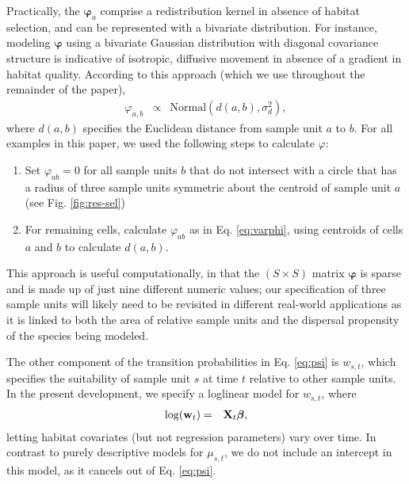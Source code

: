 \documentclass[12pt,english]{article}
\begin{document}
\begin{spacing}{1.9}
Practically, the $\boldsymbol{\varphi}_a$ comprise a redistribution kernel in absence of habitat selection, and can be represented with a bivariate distribution.  For instance, modeling $\boldsymbol{\varphi}$ using a bivariate Gaussian distribution with diagonal covariance structure is indicative of isotropic, diffusive movement in absence of a gradient in habitat quality.  According to this approach (which we use throughout the remainder of the paper),
\begin{eqnarray}
  \varphi_{a,b} & \propto & \text{Normal}(d(a,b),\sigma_d^2), \label{eq:varphi}
\end{eqnarray}
where $d(a,b)$ specifies the Euclidean distance from sample unit $a$ to $b$. For all examples in this paper, we used the following steps to calculate $\varphi$:
\begin{enumerate}
  \item Set $\varphi_{ab}=0$ for all sample units $b$ that do not intersect with a circle that has a radius of three sample units symmetric about the centroid of sample unit $a$ (see Fig. \ref{fig:res-sel})
  \item For remaining cells, calculate $\varphi_{ab}$ as in Eq. \ref{eq:varphi}, using centroids of cells $a$ and $b$ to calculate $d(a,b)$.
\end{enumerate}
This approach is useful computationally, in that the $(S \times S)$ matrix $\boldsymbol{\varphi}$ is sparse and is made up of just nine different numeric values; our specification of three sample units will likely need to be revisited in different real-world applications as it is linked to both the area of relative sample units and the dispersal propensity of the species being modeled.

The other component of the transition probabilities in Eq. \ref{eq:psi} is $w_{s,t}$, which specifies the suitability of sample unit $s$ at time $t$ relative to other sample units.  In the present development, we specify a loglinear model for $w_{s,t}$, where
\begin{eqnarray*}
  \log({\bf w}_t) & = & {\bf X}_t \boldsymbol{\beta}, %
\end{eqnarray*}
letting habitat covariates (but not regression parameters) vary over time.  In contrast to purely descriptive models for $\mu_{s,t}$, we do not include an intercept in this model, as it cancels out of Eq. \ref{eq:psi}.


\end{spacing}
\end{document}

